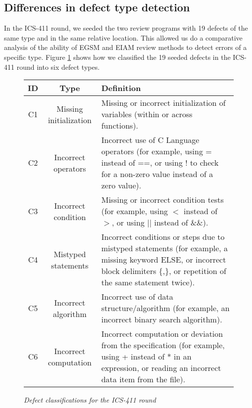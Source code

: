 \subsection{Differences in defect type detection}

In the ICS-411 round, we seeded the two review programs with 19 defects of
the same type and in the same relative location.  This allowed us do a
comparative analysis of the ability of EGSM and EIAM review methods to
detect errors of a specific type.  Figure \ref{fig:defect-class} shows how
we classified the 19 seeded defects in the ICS-411 round into six defect
types.


\begin{figure}[t]
  \begin{center}
  \begin{tabular}{|c|c|p{3in}|}
   \hline
    ID & Type & Definition \\
   \hline
   C1 & Missing initialization &
        Missing or incorrect initialization of  variables
        (within or across functions).  \\
   C2 & Incorrect operators &
        Incorrect use of C Language operators (for example, using = 
        instead of ==, or using $!$ to check for a non-zero value instead
        of a zero value).\\
   C3 & Incorrect condition &
        Missing or incorrect condition tests (for example, using $<$
        instead of $>$, or using $||$ instead of \&\&).\\
   C4 & Mistyped statements &
        Incorrect conditions or  steps due to mistyped
        statements (for example, a missing keyword ELSE, or incorrect block
        delimiters \{,\}, or repetition of the same statement twice).\\
   C5 & Incorrect algorithm &
        Incorrect use of data structure/algorithm (for example,
        an incorrect binary search algorithm). \\
   C6 & Incorrect computation &
        Incorrect computation or deviation from the specification
        (for example, using + instead of * in an expression, or reading an incorrect
        data item from the file).\\
  \hline
   \end{tabular}
  \end{center}
 \caption{{\em Defect classifications for the ICS-411 round}}
 \label{fig:defect-class}
\end{figure}



